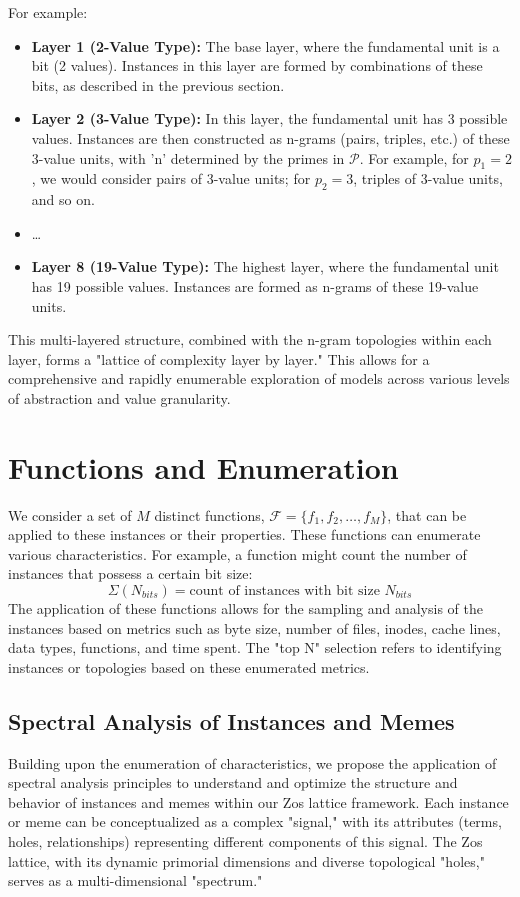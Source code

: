 \documentclass{article}
\begin{document}
For example:
\begin{itemize}
    \item \textbf{Layer 1 (2-Value Type):} The base layer, where the fundamental unit is a bit (2 values). Instances in this layer are formed by combinations of these bits, as described in the previous section.
    \item \textbf{Layer 2 (3-Value Type):} In this layer, the fundamental unit has 3 possible values. Instances are then constructed as n-grams (pairs, triples, etc.) of these 3-value units, with 'n' determined by the primes in $\mathcal{P}$. For example, for $p_1=2$, we would consider pairs of 3-value units; for $p_2=3$, triples of 3-value units, and so on.
    \item \ldots
    \item \textbf{Layer 8 (19-Value Type):} The highest layer, where the fundamental unit has 19 possible values. Instances are formed as n-grams of these 19-value units.
\end{itemize}
This multi-layered structure, combined with the n-gram topologies within each layer, forms a "lattice of complexity layer by layer." This allows for a comprehensive and rapidly enumerable exploration of models across various levels of abstraction and value granularity.

\section{Functions and Enumeration}
We consider a set of $M$ distinct functions, $\mathcal{F} = \{f_1, f_2, \ldots, f_M\}$, that can be applied to these instances or their properties. These functions can enumerate various characteristics. For example, a function might count the number of instances that possess a certain bit size:
\[ \Sigma(N_{bits}) = \text{count of instances with bit size } N_{bits} \]
The application of these functions allows for the sampling and analysis of the instances based on metrics such as byte size, number of files, inodes, cache lines, data types, functions, and time spent. The "top N" selection refers to identifying instances or topologies based on these enumerated metrics.

\subsection{Spectral Analysis of Instances and Memes}
Building upon the enumeration of characteristics, we propose the application of spectral analysis principles to understand and optimize the structure and behavior of instances and memes within our Zos lattice framework. Each instance or meme can be conceptualized as a complex "signal," with its attributes (terms, holes, relationships) representing different components of this signal. The Zos lattice, with its dynamic primorial dimensions and diverse topological "holes," serves as a multi-dimensional "spectrum."
\end{document}
